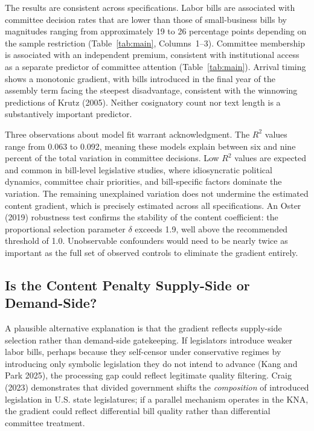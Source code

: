 \documentclass[11pt]{article}
\begin{document}
The results are consistent across specifications. Labor bills are associated with committee decision rates that are lower than those of small-business bills by magnitudes ranging from approximately 19 to 26 percentage points depending on the sample restriction (Table~\ref{tab:main}, Columns~1--3). Committee membership is associated with an independent premium, consistent with institutional access as a separate predictor of committee attention (Table~\ref{tab:main}). Arrival timing shows a monotonic gradient, with bills introduced in the final year of the assembly term facing the steepest disadvantage, consistent with the winnowing predictions of Krutz (2005). Neither cosignatory count nor text length is a substantively important predictor.

Three observations about model fit warrant acknowledgment. The $R^2$ values range from 0.063 to 0.092, meaning these models explain between six and nine percent of the total variation in committee decisions. Low $R^2$ values are expected and common in bill-level legislative studies, where idiosyncratic political dynamics, committee chair priorities, and bill-specific factors dominate the variation. The remaining unexplained variation does not undermine the estimated content gradient, which is precisely estimated across all specifications. An Oster (2019) robustness test confirms the stability of the content coefficient: the proportional selection parameter $\delta$ exceeds 1.9, well above the recommended threshold of 1.0. Unobservable confounders would need to be nearly twice as important as the full set of observed controls to eliminate the gradient entirely.

\subsection{Is the Content Penalty Supply-Side or Demand-Side?}
\label{sec:results-supply}

A plausible alternative explanation is that the gradient reflects supply-side selection rather than demand-side gatekeeping. If legislators introduce weaker labor bills, perhaps because they self-censor under conservative regimes by introducing only symbolic legislation they do not intend to advance (Kang and Park 2025), the processing gap could reflect legitimate quality filtering. Craig (2023) demonstrates that divided government shifts the \emph{composition} of introduced legislation in U.S. state legislatures; if a parallel mechanism operates in the KNA, the gradient could reflect differential bill quality rather than differential committee treatment.
\end{document}
